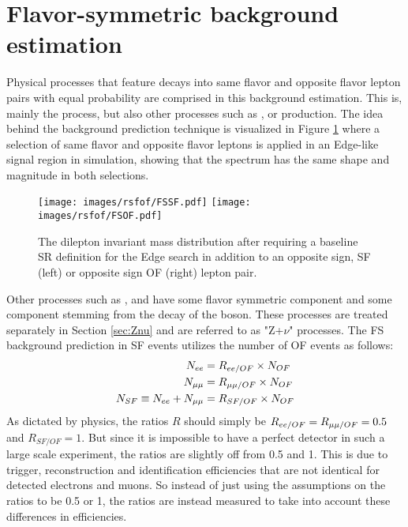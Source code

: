 \section{Flavor-symmetric background estimation}\label{sec:fsBG}
\noindent
\justify
Physical processes that feature decays into same flavor and opposite flavor lepton pairs with equal probability are comprised in this background estimation. 
This is, mainly the \ttbar process, but also other processes such as \PWW, or \ttW production.
\newpara
\noindent\justify
The idea behind the background prediction technique is visualized in Figure \ref{fig:rsfofMC} where a selection of same flavor and opposite flavor leptons is applied in an Edge-like signal region in simulation, showing that the \ttbar spectrum has the same shape and magnitude in both selections.    
\begin{figure}[htbp!]
\begin{center}
    \texttt{[image: images/rsfof/FSSF.pdf]}
    \texttt{[image: images/rsfof/FSOF.pdf]} 
    \caption{The dilepton invariant mass distribution after requiring a baseline SR definition for the Edge search in addition to an opposite sign, SF (left) or opposite sign OF (right) lepton pair.}
\label{fig:rsfofMC}
\end{center}
\end{figure}                                                                               
Other processes such as \PWZ, \PZZ and \ttZ have some flavor symmetric component and some component stemming from the decay of the \PZ boson.
These processes are treated separately in Section \ref{sec:Znu} and are referred to as "Z+$\nu$" processes. 
The FS background prediction in SF events utilizes the number of OF events as follows:
\begin{align}
\label{eq:masterformula}
    N_{ee} & = R_{ee/OF} \times N_{OF}\notag \\
    N_{\mu\mu} & = R_{\mu\mu/OF} \times N_{OF}\notag\\
    N_{SF} \equiv N_{ee} + N_{\mu\mu} & = R_{SF/OF} \times N_{OF}
\end{align}
As dictated by physics, the ratios $R$ should simply be $R_{ee/OF}=R_{\mu\mu/OF}=0.5$ and $R_{SF/OF}=1$.
But since it is impossible to have a perfect detector in such a large scale experiment, the ratios are slightly off from 0.5 and 1. 
This is due to trigger, reconstruction and identification efficiencies that are not identical for detected electrons and muons. 
So instead of just using the assumptions on the ratios to be 0.5 or 1, the ratios are instead measured to take into account these differences in efficiencies. 
